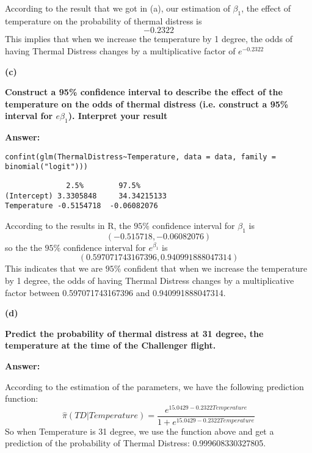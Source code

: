 \documentclass[letterpaper,11pt]{article}
\begin{document}
According to the result that we got in (a), our estimation of $\beta_1$, the effect of temperature on the probability of thermal distress is $$-0.2322$$
This implies that when we increase the temperature by 1 degree, the odds of having Thermal Distress changes by a multiplicative factor of $e^{-0.2322}$

\begin{addmargin}[-1.1em]{0em}
  \textbf{(c)}\par
\end{addmargin}
\textbf{Construct a 95\% confidence interval to describe the effect of the temperature on the odds of thermal distress (i.e. construct a 95\% interval for $e\beta_1$). Interpret your result}\par
\bigbreak
\begin{addmargin}[-0.5em]{0em}
  \textbf{Answer: }
\end{addmargin}


\begin{lstlisting}
confint(glm(ThermalDistress~Temperature, data = data, family = binomial("logit")))
\end{lstlisting}

\begin{lstlisting}
              2.5%	      97.5%
(Intercept)	3.3305848	  34.34215133
Temperature	-0.5154718	-0.06082076
\end{lstlisting}
According to the results in R, the $95\%$ confidence interval for $\beta_1$ is $$(-0.515718,-0.06082076)$$
so the the $95\%$ confidence interval for $e^{\beta_1}$ is $$(0.597071743167396,0.940991888047314)$$
This indicates that we are $95\%$ confident that when we increase the temperature by 1 degree, the odds of having Thermal Distress changes by a multiplicative factor between 0.597071743167396 and 0.940991888047314.


\begin{addmargin}[-1.1em]{0em}
  \textbf{(d)}\par
\end{addmargin}
\textbf{Predict the probability of thermal distress at 31 degree, the temperature at the time of the Challenger flight.}\par
\bigbreak
\begin{addmargin}[-0.5em]{0em}
  \textbf{Answer: }
\end{addmargin}

According to the estimation of the parameters, we have the following prediction function:
$$\hat\pi(TD\vert Temperature) = \frac{e^{15.0429-0.2322Temperature}}{1+e^{15.0429-0.2322Temperature}}$$
So when Temperature is 31 degree, we use the function above and get a prediction of the probability of Thermal Distress: 0.999608330327805.
\end{document}
